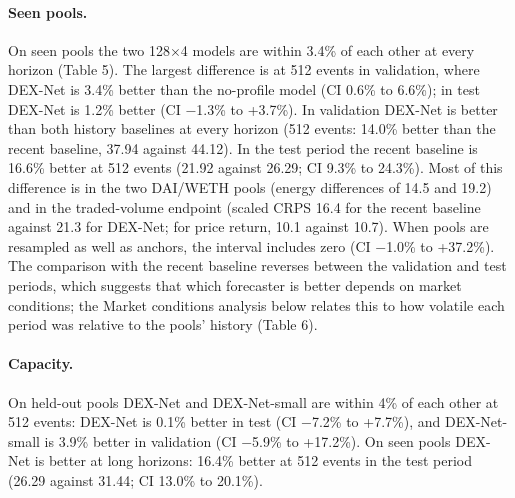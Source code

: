 \documentclass[11pt]{article}
\begin{document}
\paragraph{Seen pools.} On seen pools the two 128\ensuremath{\times}4 models are within 3.4\% of each other at every horizon (Table 5). The largest difference is at 512 events in validation, where DEX-Net is 3.4\% better than the no-profile model (CI 0.6\% to 6.6\%); in test DEX-Net is 1.2\% better (CI \ensuremath{-}1.3\% to +3.7\%). In validation DEX-Net is better than both history baselines at every horizon (512 events: 14.0\% better than the recent baseline, 37.94 against 44.12). In the test period the recent baseline is 16.6\% better at 512 events (21.92 against 26.29; CI 9.3\% to 24.3\%). Most of this difference is in the two DAI/WETH pools (energy differences of 14.5 and 19.2) and in the traded-volume endpoint (scaled CRPS 16.4 for the recent baseline against 21.3 for DEX-Net; for price return, 10.1 against 10.7). When pools are resampled as well as anchors, the interval includes zero (CI \ensuremath{-}1.0\% to +37.2\%). The comparison with the recent baseline reverses between the validation and test periods, which suggests that which forecaster is better depends on market conditions; the Market conditions analysis below relates this to how volatile each period was relative to the pools' history (Table 6).

\paragraph{Capacity.} On held-out pools DEX-Net and DEX-Net-small are within 4\% of each other at 512 events: DEX-Net is 0.1\% better in test (CI \ensuremath{-}7.2\% to +7.7\%), and DEX-Net-small is 3.9\% better in validation (CI \ensuremath{-}5.9\% to +17.2\%). On seen pools DEX-Net is better at long horizons: 16.4\% better at 512 events in the test period (26.29 against 31.44; CI 13.0\% to 20.1\%).
\end{document}
